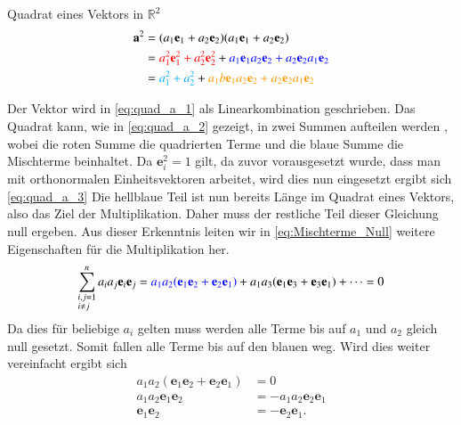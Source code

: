 \begin{beispiel}
Quadrat eines Vektors in $\mathbb{R}^2$
\begin{equation}
    \begin{split}
    \textbf{a}^2 
    &= (a_1\textbf{e}_1+a_2\textbf{e}_2)(a_1\textbf{e}_1+a_2\textbf{e}_2) \\\
    &= \textcolor{red}{a_1^2\textbf{e}_1^2 + a_2^2\textbf{e}_2^2} 
    + \textcolor{blue}{a_1\textbf{e}_1a_2\textbf{e}_2 + a_2\textbf{e}_2a_1\textbf{e}_2}   \\\
    & = \textcolor{cyan}{a_1^2 + a_2^2} + \textcolor{orange}{a_1b\textbf{e}_1a_2\textbf{e}_2 + a_2\textbf{e}_2a_1\textbf{e}_2}
    \end{split}
\end{equation}

\end{beispiel}
Der Vektor wird in \ref{eq:quad_a_1} als Linearkombination geschrieben.
Das Quadrat kann, wie in \ref{eq:quad_a_2} gezeigt, in zwei Summen aufteilen werden , wobei die roten Summe die quadrierten Terme und die blaue Summe die Mischterme beinhaltet. 
\newline
Da $\textbf{e}_i^2 = 1$ gilt, da zuvor vorausgesetzt wurde, dass man mit orthonormalen Einheitsvektoren arbeitet, wird dies nun eingesetzt ergibt sich \ref{eq:quad_a_3}
\newline
Die hellblaue Teil ist nun bereits Länge im Quadrat eines Vektors, also das Ziel der Multiplikation. 
Daher muss der restliche Teil dieser Gleichung null ergeben. 
Aus dieser Erkenntnis leiten wir in \ref{eq:Mischterme_Null} weitere Eigenschaften für die Multiplikation her.
\begin{equation}
    \label{eq:Mischterme_Null}
    \sum_{\begin{subarray}{l}i,j=1\\i \neq j\end{subarray}}^n  a_ia_j\textbf{e}_i\textbf{e}_j  = \textcolor{blue}{a_1a_2(\textbf{e}_1\textbf{e}_2 + \textbf{e}_2\textbf{e}_1)} + a_1a_3(\textbf{e}_1\textbf{e}_3 + \textbf{e}_3\textbf{e}_1) + \dots =  0
\end{equation}
Da dies für beliebige $a_i$ gelten muss werden alle Terme bis auf $a_1$ und $a_2$ gleich null gesetzt. Somit fallen alle Terme bis auf den blauen weg. Wird dies weiter vereinfacht ergibt sich
\begin{equation}
\begin{split}
    a_1a_2(\textbf{e}_1\textbf{e}_2 + \textbf{e}_2\textbf{e}_1) &= 0 \\
    a_1a_2\textbf{e}_1\textbf{e}_2 &= -a_1a_2\textbf{e}_2\textbf{e}_1 \\
    \textbf{e}_1\textbf{e}_2 &= -\textbf{e}_2\textbf{e}_1.
\end{split}
\end{equation}
